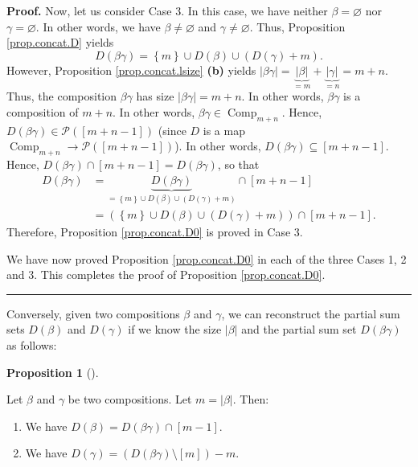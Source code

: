 \documentclass[numbers=enddot,12pt,final,onecolumn,notitlepage]{scrartcl}%
\theoremstyle{definition}
\newtheorem{prop}[theo]{Proposition}
\newenvironment{proposition}[1][]
{\begin{prop}[#1]\begin{leftbar}}
{\end{leftbar}\end{prop}}
\newenvironment{proof}[1][Proof]{\noindent\textbf{#1.} }{\ \rule{0.5em}{0.5em}}
\begin{document}
\begin{proof}
Now, let us consider Case 3. In this case, we have neither $\beta=\varnothing$
nor $\gamma=\varnothing$. In other words, we have $\beta\neq\varnothing$ and
$\gamma\neq\varnothing$. Thus, Proposition \ref{prop.concat.D} yields%
\[
D\left(  \beta\gamma\right)  =\left\{  m\right\}  \cup D\left(  \beta\right)
\cup\left(  D\left(  \gamma\right)  +m\right)  .
\]
However, Proposition \ref{prop.concat.lsize} \textbf{(b)} yields $\left\vert
\beta\gamma\right\vert =\underbrace{\left\vert \beta\right\vert }%
_{=m}+\underbrace{\left\vert \gamma\right\vert }_{=n}=m+n$. Thus, the
composition $\beta\gamma$ has size $\left\vert \beta\gamma\right\vert =m+n$.
In other words, $\beta\gamma$ is a composition of $m+n$. In other words,
$\beta\gamma\in\operatorname*{Comp}\nolimits_{m+n}$. Hence, $D\left(
\beta\gamma\right)  \in\mathcal{P}\left(  \left[  m+n-1\right]  \right)  $
(since $D$ is a map $\operatorname*{Comp}\nolimits_{m+n}\rightarrow
\mathcal{P}\left(  \left[  m+n-1\right]  \right)  $). In other words,
$D\left(  \beta\gamma\right)  \subseteq\left[  m+n-1\right]  $. Hence,
$D\left(  \beta\gamma\right)  \cap\left[  m+n-1\right]  =D\left(  \beta
\gamma\right)  $, so that%
\begin{align*}
D\left(  \beta\gamma\right)   &  =\underbrace{D\left(  \beta\gamma\right)
}_{=\left\{  m\right\}  \cup D\left(  \beta\right)  \cup\left(  D\left(
\gamma\right)  +m\right)  }\cap\left[  m+n-1\right] \\
&  =\left(  \left\{  m\right\}  \cup D\left(  \beta\right)  \cup\left(
D\left(  \gamma\right)  +m\right)  \right)  \cap\left[  m+n-1\right]  .
\end{align*}
Therefore, Proposition \ref{prop.concat.D0} is proved in Case 3.

We have now proved Proposition \ref{prop.concat.D0} in each of the three Cases
1, 2 and 3. This completes the proof of Proposition \ref{prop.concat.D0}.
\end{proof}

Conversely, given two compositions $\beta$ and $\gamma$, we can reconstruct
the partial sum sets $D\left(  \beta\right)  $ and $D\left(  \gamma\right)  $
if we know the size $\left\vert \beta\right\vert $ and the partial sum set
$D\left(  \beta\gamma\right)  $ as follows:

\begin{proposition}
\label{prop.concat.Dcut}Let $\beta$ and $\gamma$ be two compositions. Let
$m=\left\vert \beta\right\vert $. Then:

\begin{enumerate}
\item[\textbf{(a)}] We have $D\left(  \beta\right)  =D\left(  \beta
\gamma\right)  \cap\left[  m-1\right]  $.

\item[\textbf{(b)}] We have $D\left(  \gamma\right)  =\left(  D\left(
\beta\gamma\right)  \setminus\left[  m\right]  \right)  -m$.
\end{enumerate}
\end{proposition}
\end{document}
